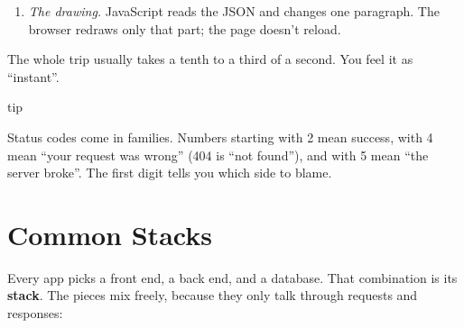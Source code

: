 \begin{enumerate}
\begin{codeblock}
  \end{codeblock}

  \begin{codeblock}
  \begin{Verbatim}[formatcom=\outputstyle]
  HTTP/1.1 200 OK
  date: Sat, 26 Sep 2026 14:31:05 GMT
  server: uvicorn
  content-length: 24
  content-type: application/json

  {"saved":true,"count":1}
  \end{Verbatim}
  \end{codeblock}

  The first line is the status. Then come headers, notes about the message. After the blank line comes the body: the handler's JSON.
\item
  \emph{The drawing.} JavaScript reads the JSON and changes one paragraph. The browser redraws only that part; the page doesn't reload.
\end{enumerate}

The whole trip usually takes a tenth to a third of a second. You feel it as ``instant''.

\begin{callout}{tip}

Status codes come in families. Numbers starting with 2 mean success, with 4 mean ``your request was wrong'' (404 is ``not found''), and with 5 mean ``the server broke''. The first digit tells you which side to blame.

\end{callout}

\section{Common Stacks}\label{04-following-one-tap:common-stacks}

Every app picks a front end, a back end, and a database. That combination is its \textbf{stack}. The pieces mix freely, because they only talk through requests and responses:


